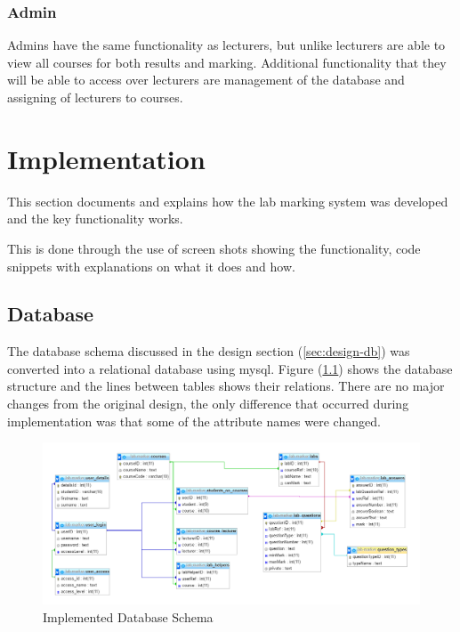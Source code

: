 \documentclass[11pt]{report}
\begin{document}
\subsection*{Admin}

Admins have the same functionality as lecturers, but unlike lecturers are able to view all courses for both results and marking. Additional functionality that they will be able to access over lecturers are management of the database and assigning of lecturers to courses.




\newpage
\chapter{Implementation}
This section documents and explains how the lab marking system was developed and the key functionality works. 

This is done through the use of screen shots showing the functionality, code snippets with explanations on what it does and how.   

\section{Database}

The database schema discussed in the design section (\ref{sec:design-db}) was converted into a relational database using mysql. Figure (\ref{fig:implement-db}) shows the database structure and the lines between tables shows their relations. There are no major changes from the original design, the only difference that occurred during implementation was that some of the attribute names were changed.  

\begin{figure}[H]
    \centering
    \includegraphics[width=1\textwidth]{images/implementation/database.png}
    \caption{Implemented Database Schema}
    \label{fig:implement-db}
\end{figure}
\end{document}
